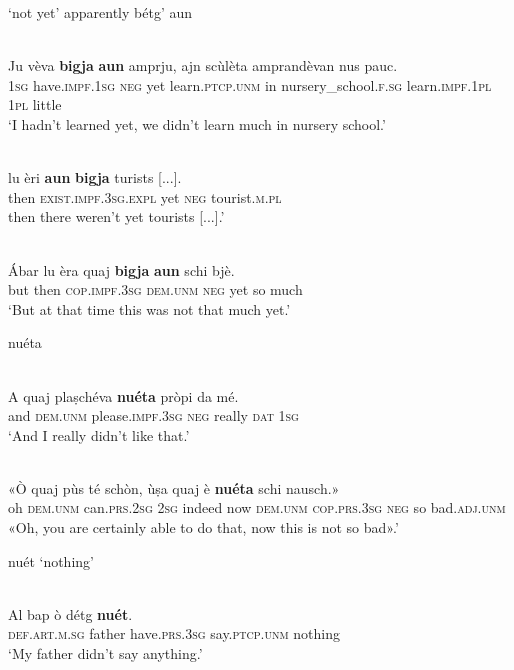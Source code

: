 `not yet' apparently bétg' aun

\ea\label{}
\\
\gll  Ju vèva \textbf{bigja} \textbf{aun} amprju, ajn scùlèta amprandèvan nus pauc.\\
\textsc{1sg} have.\textsc{impf.1sg} \textsc{neg} yet  learn.\textsc{ptcp.unm} in  nursery\_school.\textsc{f.sg} learn.\textsc{impf.1pl}  \textsc{1pl} little \\
\glt `I hadn’t learned yet, we didn’t learn much in nursery school.'
\z

\ea\label{}
\\
\gll    [...] lu èri \textbf{aun} \textbf{bigja} turists [...]. \\
{} then \textsc{exist.impf.3sg.expl} yet \textsc{neg} tourist.\textsc{m.pl}\\
\glt [...]  then there weren’t yet tourists [...].'
\z

\ea
\label{}
\\
\gll  Ábar lu èra quaj \textbf{bigja} \textbf{aun} schi bjè.  \\
but then \textsc{cop.impf.3sg} \textsc{dem.unm} \textsc{neg} yet so much  \\
\glt `But at that time this was not that much yet.'
\z

nuéta

\ea
\label{}
\\
\gll A quaj plaṣchéva \textbf{nuéta} pròpi da mé. \\
and \textsc{dem.unm} please.\textsc{impf.3sg} \textsc{neg} really \textsc{dat} \textsc{1sg}\\
\glt `And I really didn’t  like that.'
\z

\ea
\label{}
\\
	\gll «Ò quaj pùs té schòn, ùṣa quaj è \textbf{nuéta} schi nausch.»\\
oh \textsc{dem.unm} can.\textsc{prs.2sg} \textsc{2sg} indeed now \textsc{dem.unm} \textsc{cop.prs.3sg} \textsc{neg} so bad.\textsc{adj.unm}\\
\glt «Oh, you are certainly able to do that, now this is not so bad».'
\z

nuét `nothing'

\ea
\label{}
\\
	\gll Al bap ò détg \textbf{nuét}.\\
\textsc{def.art.m.sg} father have.\textsc{prs.3sg} say.\textsc{ptcp.unm} nothing\\
\glt `My father didn't say anything.'
\z



